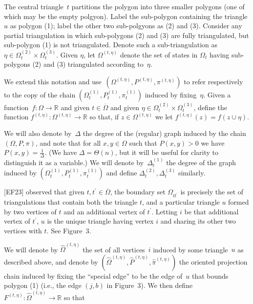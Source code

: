 \documentclass[10pt,a4paper]{article}
\begin{document}
The central triangle $t$ partitions the polygon into three smaller polygons (one of which may be the empty polgyon). Label the sub-polygon containing the triangle $u$ as polygon (1); label the other two sub-polgyons as (2) and (3). Consider any partial triangulation in which sub-polygons (2) and (3) are fully triangulated, but sub-polygon (1) is not triangulated. Denote such a sub-triangulation as $\eta\in\Omega_{t}^{(2)}\times\Omega_{t}^{(3)}$. Given $\eta$, let $\Omega^{(t,\eta)}$ denote the set of states in $\Omega_{t}$ having sub-polygons (2) and (3) triangulated according to $\eta$.\par




We extend this notation and use $\left(\Omega^{(t,\eta)},P^{(t,\eta)},\pi^{(t,\eta)}\right)$ to refer respectively to the copy of the chain $\left(\Omega_{t}^{(1)},P_{t}^{(1)},\pi_{t}^{(1)}\right)$ induced by fixing $\eta$. Given a function $f:\Omega\rightarrow\mathbb{R}$ and given $t\in\overline{\Omega}$ and given $\eta\in\Omega_{t}^{(2)}\times\Omega_{t}^{(3)}$, define the function $f^{(t,\eta)}:\Omega^{(t,\eta)}\rightarrow\mathbb{R}$ so that, if $z\in\Omega^{(t,\eta)}$ we let $f^{(t,\eta)}(z)=f(z\cup\eta)$.\par




We will also denote by $\Delta$ the degree of the (regular) graph induced by the chain $(\Omega,P,\pi)$, and note that for all $x,y\in\Omega$ such that $P(x,y)>0$ we have $P(x,y)=\frac{1}{\Delta}$. (We have $\Delta=\Theta(n)$, but it will be useful for clarity to distinguish it as a variable.) We will denote by $\Delta_{t}^{(1)}$ the degree of the graph induced by $\left(\Omega_{t}^{(1)},P_{t}^{(1)},\pi_{t}^{(1)}\right)$ and define $\Delta_{t}^{(2)},\Delta_{t}^{(3)}$ similarly.\par




[EF23] observed that given $t,t^{\prime}\in\overline{\Omega}$, the boundary set $\Omega_{tt^{\prime}}$ is precisely the set of triangulations that contain both the triangle $t$, and a particular triangle $u$ formed by two vertices of $t$ and an additional vertex of $t^{\prime}$. Letting $i$ be that additional vertex of $t^{\prime}$, $u$ is the unique triangle having vertex $i$ and sharing its other two vertices with $t$. See Figure 3.\par




We will denote by $\hat{\Omega}^{(t,\eta)}$ the set of all vertices $i$ induced by some triangle $u$ as described above, and denote by $\left(\hat{\Omega}^{(t,\eta)},\hat{P}^{(t,\eta)},\hat{\pi}^{(t,\eta)}\right)$ the oriented projection chain induced by fixing the “special edge” to be the edge of $u$ that bounds polygon (1) (i.e., the edge $(j,b)$ in Figure 3). We then define $F^{(t,\eta)}:\hat{\Omega}^{(t,\eta)}\rightarrow\mathbb{R}$ so that\par
\end{document}
